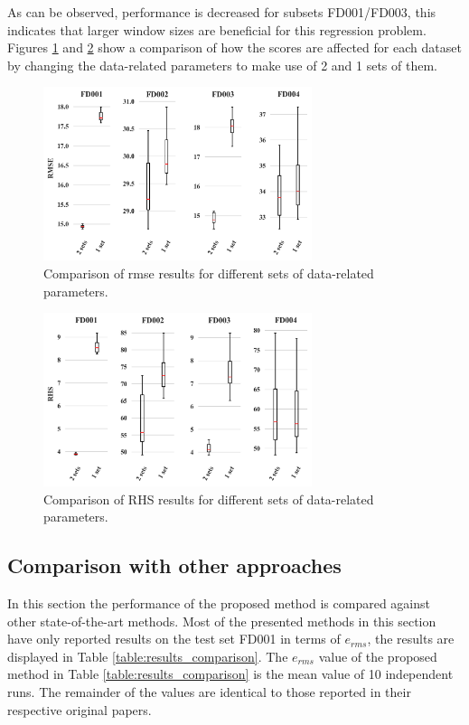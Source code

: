 \documentclass{article}
\begin{document}
As can be observed, performance is decreased for subsets FD001/FD003, this indicates that larger window sizes are beneficial for this regression problem. Figures \ref{fig:scores_rmse} and \ref{fig:scores_rhs} show a comparison of how the scores are affected for each dataset by changing the data-related parameters to make use of 2 and 1 sets of them.

\begin{figure}[!htb]
\centering
\includegraphics[width=0.7\textwidth]{../img/rmse_comparisson.png}
\caption{Comparison of \gls{rmse} results for different sets of data-related parameters.}
\label{fig:scores_rmse}
\end{figure}

\begin{figure}[!htb]
\centering
\includegraphics[width=0.7\textwidth]{../img/rhs_comparisson.png}
\caption{Comparison of RHS results for different sets of data-related parameters.}
\label{fig:scores_rhs}
\end{figure}

\subsection{Comparison with other approaches}

In this section the performance of the proposed method is compared against other state-of-the-art methods. Most of the presented methods in this section have only reported results on the test set FD001 in terms of $e_{rms}$, the results are displayed in Table \ref{table:results_comparison}. The $e_{rms}$ value of the proposed method in Table \ref{table:results_comparison} is the mean value of 10 independent runs. The remainder of the values are identical to those reported in their respective original papers.
\end{document}
